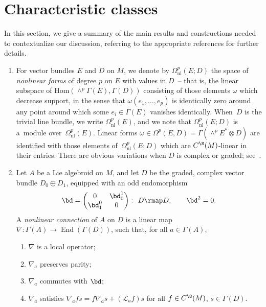 \section{Characteristic classes}\label{sec : Characteristic classes}

In this section, we give a summary of the main results and constructions needed to contextualize our discussion, referring to the appropriate references for further details.
\begin{enumerate}\itemsep=0pt
 \item For vector bundles $E$ and $D$ on $M$, we denote by $\Omega^p_{\mathrm{nl}}(E;D)$ the space of \emph{nonlinear forms} of degree $p$ on $E$ with values in $D$~-- that is, the linear subspace of $\mathrm{Hom}(\wedge^p\Gamma(E),\Gamma(D))$ consisting of those elements $\omega$ which decrease support, in the sense that $\omega(e_1,\dots ,e_p)$ is identically zero around any point around which some $e_i \in \Gamma(E)$ vanishes identically. When~$D$ is the trivial line bundle, we write $\Omega^p_{\mathrm{nl}}(E)$, and we note that $\Omega^p_{\mathrm{nl}}(E;D)$ is a~module over~$\Omega^p_{\mathrm{nl}}(E)$. Linear forms $\omega \in \Omega^p(E,D)=\Gamma(\wedge^pE^* \otimes D)$ are identified with those elements of~$\Omega^p_{\mathrm{nl}}(E;D)$ which are $C^{\8}(M)$-linear in their entries. There are obvious variations when $D$ is complex or graded; see~\cite{AbadCrainic,CrainicNL}.
 \item Let $A$ be a Lie algebroid on $M$, and let $D$ be the graded, complex vector bundle $D_0 \oplus D_1$, equipped with an odd endomorphism
\begin{gather*}
 \bd = \left(\begin{matrix}
 0 & \bd^1_0 \\
 \bd^0_1 & 0
 \end{matrix}\right) \colon \ D \rmap D, \qquad \bd^2 = 0.
\end{gather*}A \emph{nonlinear connection} of $A$ on $D$ is a linear map $\nabla \colon \Gamma(A) \to \operatorname{End}(\Gamma(D))$, such that, for all $a \in \Gamma(A)$,
\begin{enumerate}\itemsep=0pt
\item[a)] $\nabla$ is a local operator;
 \item[b)] $\nabla_a$ preserves parity;
 \item[c)] $\nabla_a$ commutes with $\bd$;
 \item[d)] $\nabla_a$ satisfies $\nabla_a fs = f\nabla_as+ (\mathscr{L}_af)s$ for all $f \in C^{\8}(M)$, $s \in \Gamma(D)$.

\end{enumerate}
\end{enumerate}
